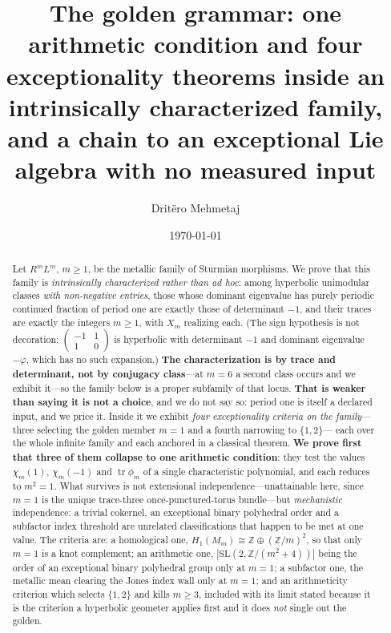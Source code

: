 \documentclass[11pt,reqno]{amsart}
\theoremstyle{plain}
\theoremstyle{definition}
\theoremstyle{remark}
\newcommand{\Z}{\mathbb{Z}}
\newcommand{\SL}{\mathrm{SL}}
\begin{document}
\title[The golden grammar]{The golden grammar: one arithmetic condition and four
  exceptionality theorems
inside an intrinsically characterized family, and a chain to an exceptional Lie algebra
with no measured input}

\author{Drit\"ero Mehmetaj}
\address{Independent Researcher}

\date{\today}


\begin{abstract}
Let $R^mL^m$, $m\ge1$, be the metallic family of Sturmian morphisms. We prove that
this family is \emph{intrinsically characterized rather than ad hoc}: among hyperbolic
unimodular classes \emph{with non-negative entries}, those whose dominant eigenvalue has
purely periodic continued fraction of period one are exactly those of determinant $-1$,
and their traces are exactly the integers $m\ge1$, with $X_m$ realizing each. (The
sign hypothesis is not decoration: $\left(\begin{smallmatrix}-1&1\\1&0\end{smallmatrix}\right)$
is hyperbolic with determinant $-1$ and dominant eigenvalue $-\varphi$, which has no such
expansion.) \textbf{The characterization is by trace and
determinant, not by conjugacy class}---at $m=6$ a second class occurs and we exhibit
it---so the family below is a proper subfamily of that locus. \textbf{That is weaker than saying it is not a choice},
and we do not say so: period one is itself a declared input, and we price it. Inside it we exhibit \emph{four exceptionality criteria on the family}---three selecting the
golden member $m=1$ and a fourth narrowing to $\{1,2\}$---
each over the whole infinite family and each anchored in a classical theorem.
\textbf{We prove first that three of them collapse to one arithmetic condition}: they
test the values $\chi_m(1)$, $\chi_m(-1)$ and $\operatorname{tr}\phi_m$ of a single
characteristic polynomial, and each reduces to $m^2=1$. What survives is not
extensional independence---unattainable here, since $m=1$ is the unique trace-three
once-punctured-torus bundle---but \emph{mechanistic} independence: a trivial cokernel,
an exceptional binary polyhedral order and a subfactor index threshold are unrelated
classifications that happen to be met at one value. The criteria are: a homological one, $H_1(M_m)\cong\Z\oplus(\Z/m)^2$, so that only
$m=1$ is a knot complement; an arithmetic one, $|\SL(2,\Z/(m^2{+}4))|$ being the order
of an exceptional binary polyhedral group only at $m=1$; a subfactor one, the metallic
mean clearing the Jones index wall only at $m=1$; and an arithmeticity criterion which
selects $\{1,2\}$ and kills $m\ge3$, included with its limit stated because it is the
criterion a hyperbolic geometer applies first and it does \emph{not} single out the
golden.


\end{abstract}
\end{document}

